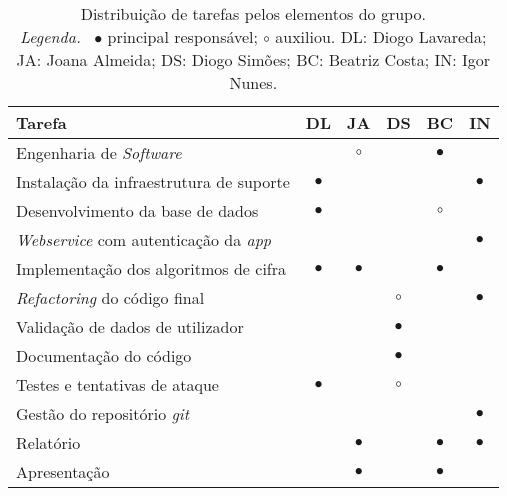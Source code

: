 \begin{table}[!htbp]
    \centering
    \begin{tabular}{l c c c c c}
        \toprule
        \textbf{Tarefa}                                      & \textbf{DL} & \textbf{JA} & \textbf{DS} & \textbf{BC} & \textbf{IN} \\
        \midrule
        Engenharia de \textit{Software}                      &             & $\circ$     &             & $\bullet$    &            \\
        Instalação da infraestrutura de suporte              & $\bullet$   &             &             &              & $\bullet$  \\
        Desenvolvimento da base de dados                     & $\bullet$   &             &             & $\circ$      &            \\
        \textit{Webservice} com autenticação da \textit{app} &             &             &             &              & $\bullet$  \\
        Implementação dos algoritmos de cifra                & $\bullet$   & $\bullet$   &             & $\bullet$    &            \\
        \textit{Refactoring} do código final                 &             &             & $\circ$     &              & $\bullet$  \\
        Validação de dados de utilizador                     &             &             & $\bullet$   &              &            \\
        Documentação do código                               &             &             & $\bullet$   &              &            \\
        Testes e tentativas de ataque                        & $\bullet$   &             & $\circ$     &              &            \\
        Gestão do repositório \textit{git}                   &             &             &             &              & $\bullet$  \\
        Relatório                                            &             & $\bullet$   &             & $\bullet$    & $\bullet$  \\
        Apresentação                                         &             & $\bullet$   &             & $\bullet$    &            \\
        \bottomrule
    \end{tabular}
    \caption[Distribuição de tarefas]{
        Distribuição de tarefas pelos elementos do grupo.\\
        \textit{Legenda.}~%
        $\bullet$ principal responsável; $\circ$ auxiliou.
        DL: Diogo Lavareda; JA: Joana Almeida; DS: Diogo Simões; BC: Beatriz Costa; IN: Igor Nunes.
    }
    \label{tab::divisao-trabalho}
\end{table}


